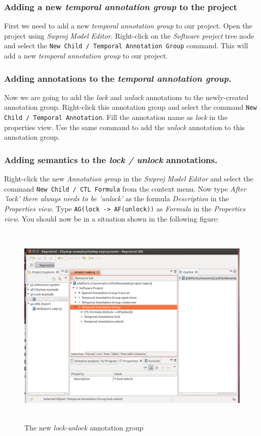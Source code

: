 \subsubsection{Adding a new \emph{temporal annotation group} to the project}
First we need to add a new \emph{temporal annotation group} to our project. Open the project using \emph{Swproj Model Editor}.
Right-click on the \emph{Software project} tree node and select the \texttt{New Child / Temporal Annotation Group} command.
This will add a new \emph{temporal annotation group} to our project.

\subsubsection{Adding annotations to the \emph{temporal annotation group}.}
Now we are going to add the \emph{lock} and \emph{unlock} annotations to the newly-created annotation group. Right-click this annotation
group and select the command \texttt{New Child / Temporal Annotation}. Fill the annotation name as \emph{lock} in the properties
view. Use the same command to add the \emph{unlock} annotation to this annotation group.

\subsubsection{Adding semantics to the \emph{lock / unlock} annotations.}
Right-click the new \emph{Annotation group} in the \emph{Swproj Model Editor} and select the command \texttt{New Child / CTL Formula}
from the context menu. Now type \emph{After 'lock' there always needs to be 'unlock'} as the formula \emph{Description} in the
\emph{Properties view}. Type \texttt{AG(lock -> AF(unlock))} as \emph{Formula} in the \emph{Properties view}.
You should now be in a situation shown in the following figure:

\newpage

\begin{figure}[ht]
  \centering
  \includegraphics[height=280pt]{images/reprotoolLockUnlock}
  \caption{The new \emph{lock-unlock} annotation group}
  \label{fig:reprotoolLockUnlock}
\end{figure}

